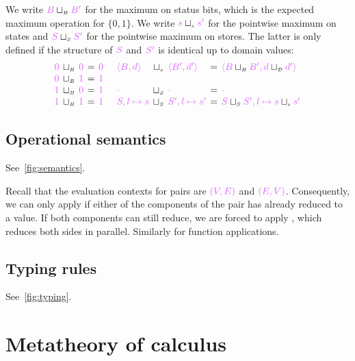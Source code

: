 \documentclass[main.tex]{subfiles}
\begin{document}
We write $\tm{B}\sqcupB\tm{B'}$ for the maximum on status bits, which is the expected maximum operation for $\{0,1\}$. We write $\tm{s}\sqcups\tm{s'}$ for the pointwise maximum on states and $\tm{S}\sqcupS\tm{S'}$ for the pointwise maximum on stores. The latter is only defined if the structure of $\tm{S}$ and $\tm{S'}$ is identical up to domain values:
\[
\setlength{\arraycolsep}{2pt}
\begin{array}{lclcl}
  \tm{0} & \sqcupB & \tm{0} & = & \tm{0} \\
  \tm{0} & \sqcupB & \tm{1} & = & \tm{1} \\
  \tm{1} & \sqcupB & \tm{0} & = & \tm{1} \\
  \tm{1} & \sqcupB & \tm{1} & = & \tm{1}
\end{array}
\quad
\begin{array}{lclcl}
  \tm{\langle B, d \rangle} & \sqcups & \tm{\langle B', d' \rangle}
  & = & \tm{\langle B \sqcupB B', d \sqcupD d' \rangle}
  \\
  \\
  \tm{\emptyenv}      & \sqcupS & \tm{\emptyenv}        & = & \tm{\emptyenv} \\
  \tm{S, l \mapsto s} & \sqcupS & \tm{S', l \mapsto s'} & = & \tm{S \sqcupS S', l \mapsto s \sqcups s'}
\end{array}
\]

\subsection{Operational semantics}
\label{sec:lvar-semantics}

See~\cref{fig:semantics}.

Recall that the evaluation contexts for pairs are $\tm{(V, E)}$ and $\tm{(E, V)}$. Consequently, we can only apply  if either of the components of the pair has already reduced to a value. If both components can still reduce, we are forced to apply , which reduces both sides in parallel. Similarly for function applications.

\subsection{Typing rules}%
\label{sec:lvar-typing}

See~\cref{fig:typing}.

\section{Metatheory of \typedlambdalvar calculus}
\end{document}
